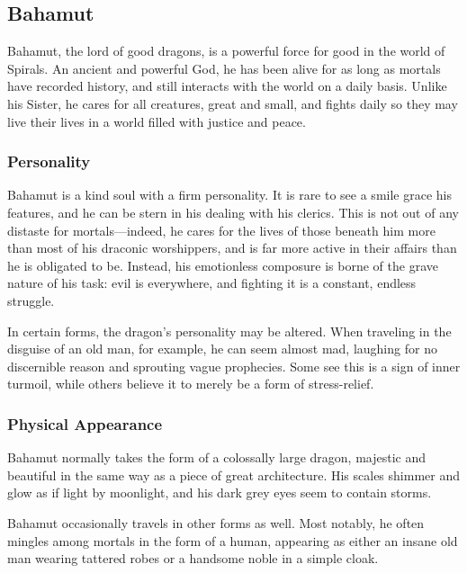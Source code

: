 \subsection*{Bahamut}
\begin{goddesc}
\end{goddesc}
Bahamut, the lord of good dragons, is a powerful force for good in the world of Spirals.
An ancient and powerful God, he has been alive for as long as mortals have recorded history, and still interacts with the world on a daily basis.
Unlike his Sister, he cares for all creatures, great and small, and fights daily so they may live their lives in a world filled with justice and peace.

\subsubsection*{Personality}
Bahamut is a kind soul with a firm personality.
It is rare to see a smile grace his features, and he can be stern in his dealing with his clerics.
This is not out of any distaste for mortals---indeed, he cares for the lives of those beneath him more than most of his draconic worshippers, and is far more active in their affairs than he is obligated to be.
Instead, his emotionless composure is borne of the grave nature of his task: evil is everywhere, and fighting it is a constant, endless struggle.

In certain forms, the dragon's personality may be altered.
When traveling in the disguise of an old man, for example, he can seem almost mad, laughing for no discernible reason and sprouting vague prophecies.
Some see this is a sign of inner turmoil, while others believe it to merely be a form of stress-relief.

\subsubsection*{Physical Appearance}
Bahamut normally takes the form of a colossally large dragon, majestic and beautiful in the same way as a piece of great architecture.
His scales shimmer and glow as if light by moonlight, and his dark grey eyes seem to contain storms.

Bahamut occasionally travels in other forms as well.
Most notably, he often mingles among mortals in the form of a human, appearing as either an insane old man wearing tattered robes or a handsome noble in a simple cloak.


